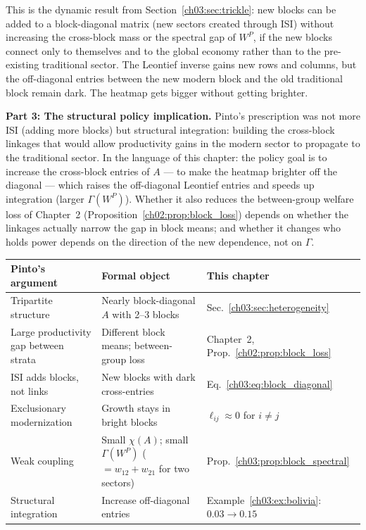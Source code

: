 \documentclass[../structural_economics_book.tex]{subfiles}
\begin{document}
This is the dynamic result from Section~\ref{ch03:sec:trickle}: new blocks can be added to a block-diagonal matrix (new sectors created through ISI) without increasing the cross-block mass or the spectral gap of $W^P$, if the new blocks connect only to themselves and to the global economy rather than to the pre-existing traditional sector. The Leontief inverse gains new rows and columns, but the off-diagonal entries between the new modern block and the old traditional block remain dark. The heatmap gets bigger without getting brighter.

\textbf{Part 3: The structural policy implication.} Pinto's prescription was not more ISI (adding more blocks) but structural integration: building the cross-block linkages that would allow productivity gains in the modern sector to propagate to the traditional sector. In the language of this chapter: the policy goal is to increase the cross-block entries of $A$ --- to make the heatmap brighter off the diagonal --- which raises the off-diagonal Leontief entries and speeds up integration (larger $\Gamma(W^P)$). Whether it also reduces the between-group welfare loss of Chapter~2 (Proposition~\ref{ch02:prop:block_loss}) depends on whether the linkages actually narrow the gap in block means; and whether it changes who holds power depends on the direction of the new dependence, not on $\Gamma$.

\begin{center}
\begin{tabularx}{\textwidth}{LLL}
\toprule
\textbf{Pinto's argument} & \textbf{Formal object} & \textbf{This chapter} \\
\midrule
Tripartite structure & Nearly block-diagonal $A$ with 2--3 blocks & Sec.~\ref{ch03:sec:heterogeneity} \\
Large productivity gap between strata & Different block means; between-group loss & Chapter~2, Prop.~\ref{ch02:prop:block_loss} \\
ISI adds blocks, not links & New blocks with dark cross-entries & Eq.~\eqref{ch03:eq:block_diagonal} \\
Exclusionary modernization & Growth stays in bright blocks & $\ell_{ij} \approx 0$ for $i \neq j$ \\
Weak coupling & Small $\chi(A)$; small $\Gamma(W^P)$ ($= w_{12} + w_{21}$ for two sectors) & Prop.~\ref{ch03:prop:block_spectral} \\
Structural integration & Increase off-diagonal entries & Example~\ref{ch03:ex:bolivia}: $0.03 \to 0.15$ \\
\bottomrule
\end{tabularx}
\end{center}
\end{document}
